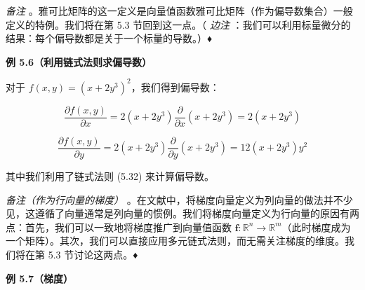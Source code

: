 \emph{备注} 。雅可比矩阵的这一定义是向量值函数雅可比矩阵（作为偏导数集合）一般定义的特例。我们将在第 5.3 节回到这一点。（ \emph{边注} ：我们可以利用标量微分的结果：每个偏导数都是关于一个标量的导数。）♦

\begin{notebox}
\textbf{例 5.6（利用链式法则求偏导数）}
\end{notebox}

\begin{notebox}
对于 $ f(x, y) = (x + 2y^3)^2 $，我们得到偏导数：

\begin{equation}
\frac{\partial f(x, y)}{\partial x} = 2(x + 2y^3) \frac{\partial}{\partial x}(x + 2y^3) = 2(x + 2y^3)
\tag{5.41}\label{eq:5-41}
\end{equation}

\begin{equation}
\frac{\partial f(x, y)}{\partial y} = 2(x + 2y^3) \frac{\partial}{\partial y}(x + 2y^3) = 12(x + 2y^3)y^2
\tag{5.42}\label{eq:5-42}
\end{equation}

其中我们利用了链式法则 (5.32) 来计算偏导数。
\end{notebox}

\emph{备注（作为行向量的梯度）} 。在文献中，将梯度向量定义为列向量的做法并不少见，这遵循了向量通常是列向量的惯例。我们将梯度向量定义为行向量的原因有两点：首先，我们可以一致地将梯度推广到向量值函数 $ \boldsymbol{f} : \mathbb{R}^n \to \mathbb{R}^m $（此时梯度成为一个矩阵）。其次，我们可以直接应用多元链式法则，而无需关注梯度的维度。我们将在第 5.3 节讨论这两点。♦

\begin{notebox}
\textbf{例 5.7（梯度）}
\end{notebox}

